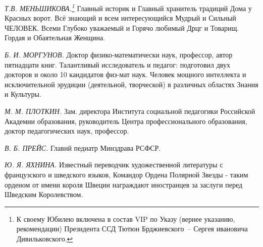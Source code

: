 \newpage

\textit{Т.В. МЕНЬШИКОВА.\protect\footnote{К своему Юбилею включена в состав VIP по Указу (вернее указанию, рекомендации) Президента ССД Тютюн Брджиевского~-- Сергея ивановича Дивильковского.}} Главный историк и Главный хранитель традиций Дома у Красных ворот. Всё знающий и всем интересующийся Мудрый и Сильный ЧЕЛОВЕК. Всеми Глубоко уважаемый и Горячо любимый Дрцг и Товарищ. Гордая и Обаятельная Женщина.

\indent

\textit{Б. И. МОРГУНОВ.} Доктор физико-математически наук, профессор, автор пятнадцати книг. Талантливый исследователь и педагог: подготовил двух докторов и около 10 кандидатов физ-мат наук. Человек мощного интеллекта и исключительной эрудиции (деятельной, творческой) в различных областях Знания и Культуры.



\indent

\textit{М. М. ПЛОТКИН.} Зам. директора Института социальной педагогики Российской Академии образования, руководитель Центра профессионального образования, доктор педагогических наук, профессор.

\indent

\textit{В. Б. ПРЕЙС.} Главнй педиатр Минздрава РСФСР.

\indent

\textit{Ю. Я. ЯХНИНА.} Известный переводчик художественной литературы с французского и шведского языков,  Командор Ордена Полярной Звезды - таким орденом от имени короля Швеции награждают иностранцев за  заслуги перед Шведским Королевством.
